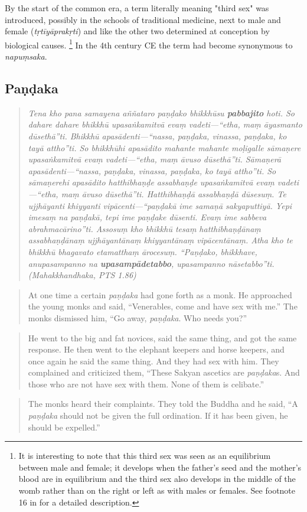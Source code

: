 By the start of the common era, a term literally meaning "third sex" was introduced, possibly in the schools of traditional medicine, next to male and female ({\em tṛtīyāprakṛti}) and like the other two determined at conception by biological causes. \footnote{It is interesting to note that this third sex was seen as an equilibrium between male and female; it develops when the father's seed and the mother's blood are in equilibrium and the third sex also develops in the middle of the womb rather than on the right or left as with males or females. See footnote 16 in \cite{zwilling} for a detailed description.} In the 4th century CE the term had become synonymous to {\em napuṃsaka}.


\subsection{Paṇḍaka}

\begin{quote}
{\em Tena kho pana samayena aññataro paṇḍako bhikkhūsu \textbf{pabbajito} hoti. So dahare dahare bhikkhū upasaṅkamitvā evaṃ vadeti—“etha, maṃ āyasmanto dūsethā”ti. Bhikkhū apasādenti—“nassa, paṇḍaka, vinassa, paṇḍaka, ko tayā attho”ti. So bhikkhūhi apasādito mahante mahante moḷigalle sāmaṇere upasaṅkamitvā evaṃ vadeti—“etha, maṃ āvuso dūsethā”ti. Sāmaṇerā apasādenti—“nassa, paṇḍaka, vinassa, paṇḍaka, ko tayā attho”ti. So sāmaṇerehi apasādito hatthibhaṇḍe assabhaṇḍe upasaṅkamitvā evaṃ vadeti—“etha, maṃ āvuso dūsethā”ti. Hatthibhaṇḍā assabhaṇḍā dūsesuṃ. Te ujjhāyanti khiyyanti vipācenti—“paṇḍakā ime samaṇā sakyaputtiyā. Yepi imesaṃ na paṇḍakā, tepi ime paṇḍake dūsenti. Evaṃ ime sabbeva abrahmacārino”ti. Assosuṃ kho bhikkhū tesaṃ hatthibhaṇḍānaṃ assabhaṇḍānaṃ ujjhāyantānaṃ khiyyantānaṃ vipācentānaṃ. Atha kho te bhikkhū bhagavato etamatthaṃ ārocesuṃ. “Paṇḍako, bhikkhave, anupasampanno na \textbf{upasampādetabbo}, upasampanno nāsetabbo”ti. (Mahakkhandhaka, PTS 1.86)}
\end{quote}

\medskip

\begin{quote}
At one time a certain {\em paṇḍaka} had gone forth as a monk. He approached the young monks and said, “Venerables, come and have sex with me.”
The monks dismissed him, “Go away, {\em paṇḍaka}. Who needs you?”
\end{quote}
\begin{quote}
He went to the big and fat novices, said the same thing, and got the same response.
He then went to the elephant keepers and horse keepers, and once again he said the same thing. And they had sex with him. They complained and criticized them, “These Sakyan ascetics are {\em paṇḍaka}s. And those who are not have sex with them. None of them is celibate.”
\end{quote}
\begin{quote}
The monks heard their complaints. They told the Buddha and he said, “A {\em paṇḍaka} should not be given the full ordination. If it has been given, he should be expelled.”
\end{quote}



